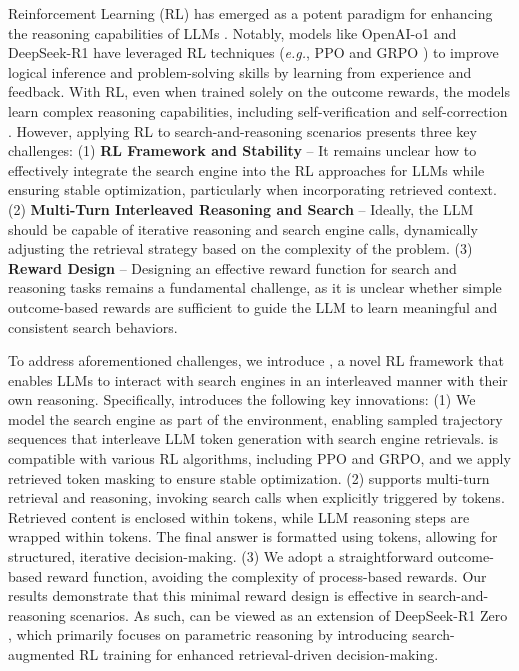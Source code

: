 Reinforcement Learning (RL) \citep{sutton1999reinforcement,kaelbling1996reinforcement} has emerged as a potent paradigm for enhancing the reasoning capabilities of LLMs \citep{guo2025deepseek,hou2025advancing,xie2025logic,kumar2024training}.
Notably, models like OpenAI-o1 \citep{jaech2024openai} and DeepSeek-R1 \citep{guo2025deepseek} have leveraged RL techniques (\textit{e.g.}, PPO \citep{schulman2017proximal} and GRPO \citep{shao2024deepseekmath}) to improve logical inference and problem-solving skills by learning from experience and feedback.
With RL, even when trained solely on the outcome rewards, the models learn complex reasoning capabilities, including self-verification \citep{weng2022large} and self-correction \citep{kumar2024training}. However, applying RL to search-and-reasoning scenarios presents three key challenges:
(1) \textbf{RL Framework and Stability} – It remains unclear how to effectively integrate the search engine into the RL approaches for LLMs while ensuring stable optimization, particularly when incorporating retrieved context.
(2) \textbf{Multi-Turn Interleaved Reasoning and Search} – Ideally, the LLM should be capable of iterative reasoning and search engine calls, dynamically adjusting the retrieval strategy based on the complexity of the problem.
(3) \textbf{Reward Design} – Designing an effective reward function for search and reasoning tasks remains a fundamental challenge, as it is unclear whether simple outcome-based rewards are sufficient to guide the LLM to learn meaningful and consistent search behaviors.

To address aforementioned challenges, we introduce \Ours, a novel RL framework that enables LLMs to interact with search engines in an interleaved manner with their own reasoning. 
Specifically, \Ours introduces the following key innovations:
(1) We model the search engine as part of the environment, enabling sampled trajectory sequences that interleave LLM token generation with search engine retrievals. \Ours is compatible with various RL algorithms, including PPO and GRPO, and we apply retrieved token masking to ensure stable optimization.
(2) \Ours supports multi-turn retrieval and reasoning, invoking search calls when explicitly triggered by  tokens. Retrieved content is enclosed within  tokens, while LLM reasoning steps are wrapped within  tokens. The final answer is formatted using  tokens, allowing for structured, iterative decision-making.
(3) We adopt a straightforward outcome-based reward function, avoiding the complexity of process-based rewards. Our results demonstrate that this minimal reward design is effective in search-and-reasoning scenarios.
As such, \Ours can be viewed as an extension of DeepSeek-R1 Zero \citep{guo2025deepseek}, which primarily focuses on parametric reasoning by introducing search-augmented RL training for enhanced retrieval-driven decision-making.

